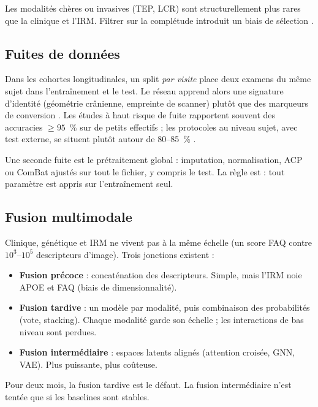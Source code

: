 Les modalités chères ou invasives (TEP, LCR) sont structurellement plus rares que la clinique et l'IRM. Filtrer sur la complétude introduit un biais de sélection \cite{park2025moira}.

\subsection{Fuites de données}

Dans les cohortes longitudinales, un split \emph{par visite} place deux examens du même sujet dans l'entraînement et le test. Le réseau apprend alors une signature d'identité (géométrie crânienne, empreinte de scanner) plutôt que des marqueurs de conversion \cite{yagis2023split,yagis2021slice}. Les études à haut risque de fuite rapportent souvent des accuracies $\geq 95$~\% sur de petits effectifs ; les protocoles au niveau sujet, avec test externe, se situent plutôt autour de 80--85~\% \cite{diagnostics2025leakage}.

Une seconde fuite est le prétraitement global : imputation, normalisation, ACP ou ComBat ajustés sur tout le fichier, y compris le test. La règle est : tout paramètre est appris sur l'entraînement seul.

\subsection{Fusion multimodale}

Clinique, génétique et IRM ne vivent pas à la même échelle (un score FAQ contre $10^3$--$10^5$ descripteurs d'image). Trois jonctions existent :

\begin{itemize}[label=, font=\large \color{darkorange}]
\item \textbf{Fusion précoce} : concaténation des descripteurs. Simple, mais l'IRM noie \ac{APOE} et FAQ (biais de dimensionnalité).
\item \textbf{Fusion tardive} : un modèle par modalité, puis combinaison des probabilités (vote, stacking). Chaque modalité garde son échelle ; les interactions de bas niveau sont perdues.
\item \textbf{Fusion intermédiaire} : espaces latents alignés (attention croisée, GNN, VAE). Plus puissante, plus coûteuse.
\end{itemize}

Pour deux mois, la fusion tardive est le défaut. La fusion intermédiaire n'est tentée que si les baselines sont stables.

